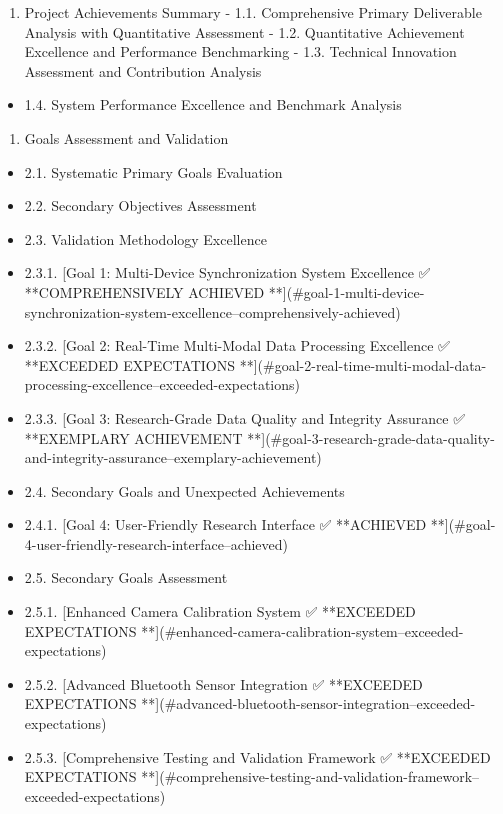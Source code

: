 \documentclass[12pt,a4paper]{report}
\begin{document}
\begin{enumerate}
\item Project Achievements Summary
    -
    1.1. Comprehensive Primary Deliverable Analysis with Quantitative Assessment
    -
    1.2. Quantitative Achievement Excellence and Performance Benchmarking
    -
    1.3. Technical Innovation Assessment and Contribution Analysis
\end{enumerate}
\begin{itemize}
\item 1.4. System Performance Excellence and Benchmark Analysis
\end{itemize}
\begin{enumerate}
\item Goals Assessment and Validation
\end{enumerate}
\begin{itemize}
\item 2.1. Systematic Primary Goals Evaluation
\item 2.2. Secondary Objectives Assessment
\item 2.3. Validation Methodology Excellence
\item 2.3.1. [Goal 1: Multi-Device Synchronization System Excellence ✅ **COMPREHENSIVELY ACHIEVED
          **](\#goal-1-multi-device-synchronization-system-excellence--comprehensively-achieved)
\item 2.3.2. [Goal 2: Real-Time Multi-Modal Data Processing Excellence ✅ **EXCEEDED EXPECTATIONS
          **](\#goal-2-real-time-multi-modal-data-processing-excellence--exceeded-expectations)
\item 2.3.3. [Goal 3: Research-Grade Data Quality and Integrity Assurance ✅ **EXEMPLARY ACHIEVEMENT
          **](\#goal-3-research-grade-data-quality-and-integrity-assurance--exemplary-achievement)
\item 2.4. Secondary Goals and Unexpected Achievements
\item 2.4.1. [Goal 4: User-Friendly Research Interface ✅ **ACHIEVED
          **](\#goal-4-user-friendly-research-interface--achieved)
\item 2.5. Secondary Goals Assessment
\item 2.5.1. [Enhanced Camera Calibration System ✅ **EXCEEDED EXPECTATIONS
          **](\#enhanced-camera-calibration-system--exceeded-expectations)
\item 2.5.2. [Advanced Bluetooth Sensor Integration ✅ **EXCEEDED EXPECTATIONS
          **](\#advanced-bluetooth-sensor-integration--exceeded-expectations)
\item 2.5.3. [Comprehensive Testing and Validation Framework ✅ **EXCEEDED EXPECTATIONS
          **](\#comprehensive-testing-and-validation-framework--exceeded-expectations)
\end{itemize}
\end{document}
